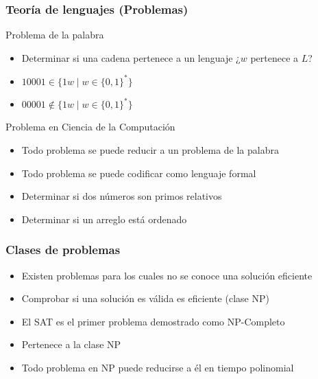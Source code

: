 \documentclass{beamer}
\begin{document}
\begin{frame}
    \frametitle{Teoría de lenguajes (Problemas)}
    
    \begin{block}{Problema de la palabra}
        \begin{itemize}
            \item Determinar si una cadena pertenece a un lenguaje ¿$w$ pertenece a $L$?
                  \pause
            \item $10001\in \{1w\mid w\in\{0,1\}^*\}$
                  \pause
            \item $00001\notin \{1w\mid w\in\{0,1\}^*\}$
        \end{itemize}
        
    \end{block}
    
    \pause
    
    \begin{block}{Problema en Ciencia de la Computación}
        \begin{itemize}
            \item Todo problema se puede reducir a un problema de la palabra
                  \pause
            \item Todo problema se puede codificar como lenguaje formal
                  \pause
            \item Determinar si dos números son primos relativos
                  \pause
            \item Determinar si un arreglo está ordenado
        \end{itemize}
    \end{block}
    
\end{frame}

\begin{frame}
    \frametitle{Clases de problemas}
    
    \begin{itemize}
        \item Existen problemas para los cuales no se conoce una solución eficiente
              \pause
        \item Comprobar si una solución es válida es eficiente (clase NP)
              \pause  
        \item El SAT es el primer problema demostrado como NP-Completo
              \pause
        \item Pertenece a la clase NP
              \pause
        \item Todo problema en NP puede reducirse a él en tiempo polinomial
    \end{itemize}
    
\end{frame}
\end{document}
